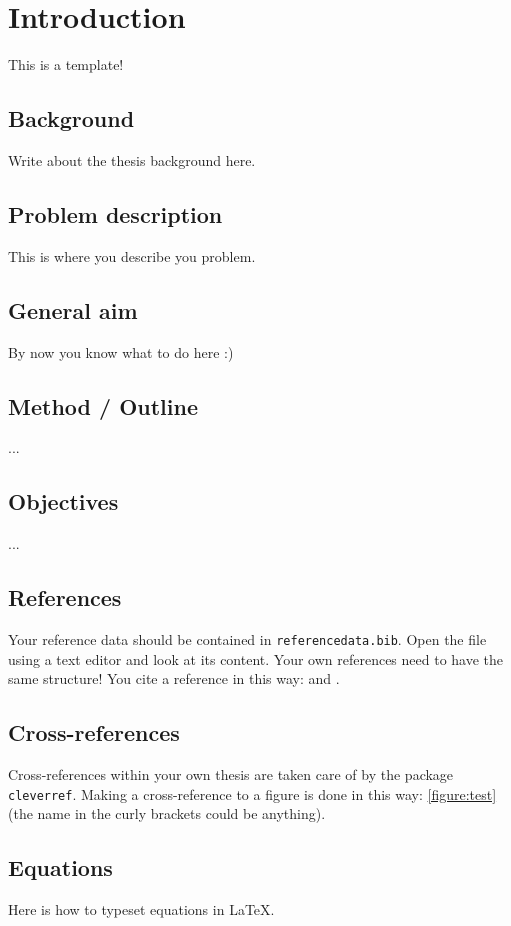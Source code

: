 \chapter{Introduction}
This is a template! 


\section{Background}
Write about the thesis background here.
\section{Problem description}
This is where you describe you problem.
\section{General aim}
By now you know what to do here :)
\section{Method / Outline }
...

\section{Objectives}
...

\section{References}
Your reference data should be contained in \texttt{referencedata.bib}. Open the file using a text editor and look at its content. Your own references need to have the same structure! You cite a reference in this way: \textcite{Harryson2014} and \textcite{Noren2006} \citeauthor{Noren2006}.

\section{Cross-references}
Cross-references within your own thesis are taken care of by the package \texttt{cleverref}. Making a cross-reference to a figure is done in this way: \cref{figure:test} (the name in the curly brackets could be anything).

\section{Equations}
Here is how to typeset equations in \LaTeX{}.

